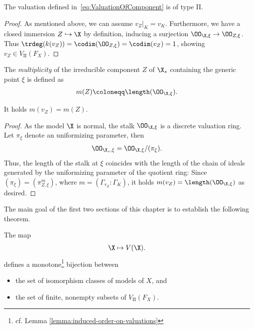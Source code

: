 \begin{proposition}\label{prop:WellDefOfInducedValuation}
    The valuation defined in~\eqref{eq:ValuationOfComponent} is of type \textrm{II}.
\end{proposition}

\begin{proof}
    As mentioned above, we can assume $v_Z|_K = v_K$.
    Furthermore, we have a closed immersion $Z \hookrightarrow \X$
    by definition, inducing a surjection $\OO_{\X,\xi} \to \OO_{Z,\xi}$.
    Thus $\trdeg(k(v_Z)) = \codim(\OO_{Z,\xi}) = \codim(v_Z) = 1$, showing $v_Z \in V_\textrm{II}(F_X)$.
\end{proof}

\begin{definition}
    The \textit{multiplicity} of the irreducible component $Z$ of $\X_s$ containing the generic point $\xi$ is defined as
    \begin{align}
        m(Z) \coloneqq \length(\OO_{\X,\xi}).
    \end{align}
\end{definition}

\begin{proposition}\label{prop:multiplicities-coincide}
    It holds $m(v_Z) = m(Z)$.
\end{proposition}

\begin{proof}
    As the model $\X$ is normal, the stalk $\OO_{\X, \xi}$ is a discrete valuation ring\@.
    Let $\pi_\xi$ denote an uniformizing parameter, then
    \begin{align}
        \OO_{\X_s,\xi} = \OO_{\X,\xi}/(\pi_\xi).
    \end{align}
    Thus, the length of the stalk at $\xi$ coincides with the length of the chain of ideals generated
    by the uniformizing parameter of the quotient ring:
    Since $(\pi_\xi) = (\pi_{Z,\xi}^m)$, where $m = (\Gamma_{v_Z}:\Gamma_K)$, it holds $m(v_Z) = \length(\OO_{\X, \xi})$ as desired.
\end{proof}

The main goal of the first two sections of this chapter is to establish the following theorem.

\begin{theorem}\label{thm:bijectionModelsAndComponents}
    The map
    \begin{align} \label{eq:mapFromModelToValuation}
        \X \mapsto V(\X).
    \end{align}
    defines a monotone\footnote{cf. Lemma \ref{lemma:induced-order-on-valuations}} bijection between
    \begin{itemize}
        \item the set of isomorphism classes of models of $X$, and
        \item the set of finite, nonempty subsets of $V_\textrm{II}(F_X)$.
    \end{itemize}
\end{theorem}

